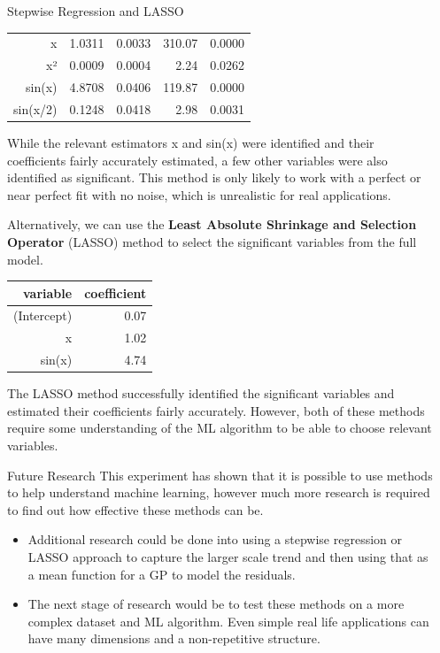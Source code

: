 \documentclass[final]{beamer}
\newlength{\sepwidth}
\newlength{\colwidth}
\newcommand{\separatorcolumn}{\begin{column}{\sepwidth}\end{column}}
\begin{document}
\begin{frame}[t]
\begin{columns}[t]
\begin{column}{\colwidth}
\begin{block}{Stepwise Regression and LASSO}
\begin{table}[ht]
\begin{tabular}{rrrrr}
						x           & 1.0311   & 0.0033     & 310.07  & 0.0000  \\
						x²          & 0.0009   & 0.0004     & 2.24    & 0.0262  \\
						sin(x)      & 4.8708   & 0.0406     & 119.87  & 0.0000  \\
						sin(x/2)    & 0.1248   & 0.0418     & 2.98    & 0.0031  \\
						\hline
					\end{tabular}
				\end{table}
				While the relevant estimators x and sin(x) were identified and their coefficients fairly accurately estimated, a few other variables were also identified as significant.
				This method is only likely to work with a perfect or near perfect fit with no noise, which is unrealistic for real applications.
				
				Alternatively, we can use the \textbf{Least Absolute Shrinkage and Selection Operator} (LASSO) method to select the significant variables from the full model.
				\begin{table}[ht]
					\centering
					\begin{tabular}{rr}
						\hline
						variable    & coefficient \\
						\hline
						(Intercept) & 0.07        \\
						x           & 1.02        \\
						sin(x)      & 4.74        \\
						\hline
					\end{tabular}
				\end{table}
				The LASSO method successfully identified the significant variables and estimated their coefficients fairly accurately.
				However, both of these methods require some understanding of the ML algorithm to be able to choose relevant variables. 
			\end{block}
			\begin{block}{Future Research}
				This experiment has shown that it is possible to use methods to help understand machine learning, however much more research is required to find out how effective these methods can be. 
				\begin{itemize}
					\item Additional research could be done into using a stepwise regression or LASSO approach to capture the larger scale trend and then using that as a mean function for a GP to model the residuals.
					\item The next stage of research would be to test these methods on a more complex dataset and ML algorithm.
					      Even simple real life applications can have many dimensions and a non-repetitive structure.
				\end{itemize}
			\end{block}
		\end{column}
		\separatorcolumn
	\end{columns}
\end{frame}
\end{document}
